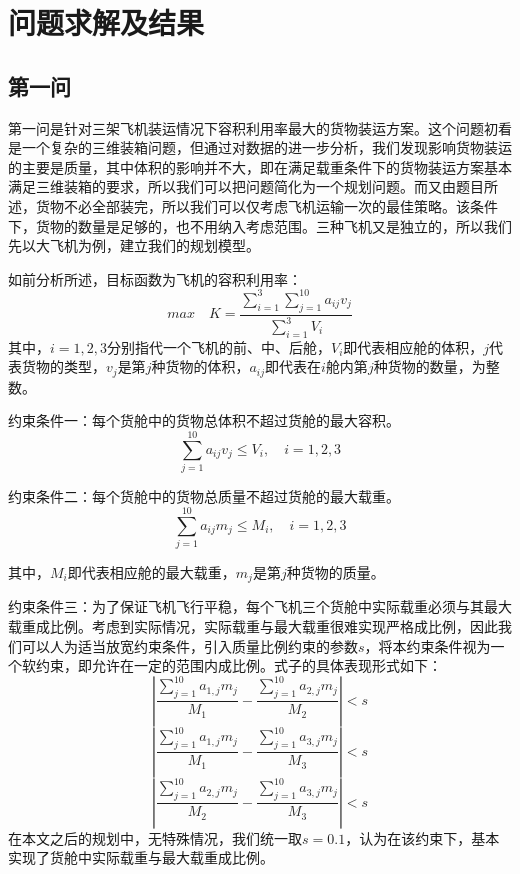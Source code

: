 \documentclass{article}
\begin{document}
	\section{问题求解及结果}
	\subsection{第一问}
	第一问是针对三架飞机装运情况下容积利用率最大的货物装运方案。这个问题初看是一个复杂的三维装箱问题，但通过对数据的进一步分析，我们发现影响货物装运的主要是质量，其中体积的影响并不大，即在满足载重条件下的货物装运方案基本满足三维装箱的要求，所以我们可以把问题简化为一个规划问题。而又由题目所述，货物不必全部装完，所以我们可以仅考虑飞机运输一次的最佳策略。该条件下，货物的数量是足够的，也不用纳入考虑范围。三种飞机又是独立的，所以我们先以大飞机为例，建立我们的规划模型。
	
	如前分析所述，目标函数为飞机的容积利用率：
	\begin{equation}
		max\quad  K=\frac{\sum_{i=1}^{3}\sum_{j=1}^{10}a_{ij}v_{j}}{\sum_{i=1}^{3}V_{i}}
	\end{equation}
	其中，$i=1,2,3$分别指代一个飞机的前、中、后舱，$V_{i}$即代表相应舱的体积，$j$代表货物的类型，$v_{j}$是第$j$种货物的体积，$a_{ij}$即代表在$i$舱内第$j$种货物的数量，为整数。
	
	约束条件一：每个货舱中的货物总体积不超过货舱的最大容积。
	\begin{equation}
		\sum_{j=1}^{10}a_{ij}v_{j}\leq V_{i},\quad i=1,2,3
	\end{equation}
	
	约束条件二：每个货舱中的货物总质量不超过货舱的最大载重。
	\begin{equation}
		\sum_{j=1}^{10}a_{ij}m_{j}\leq M_{i},\quad i=1,2,3
	\end{equation}
	
	其中，$M_{i}$即代表相应舱的最大载重，$m_{j}$是第$j$种货物的质量。
	
	约束条件三：为了保证飞机飞行平稳，每个飞机三个货舱中实际载重必须与其最大载重成比例。考虑到实际情况，实际载重与最大载重很难实现严格成比例，因此我们可以人为适当放宽约束条件，引入质量比例约束的参数$s$，将本约束条件视为一个软约束，即允许在一定的范围内成比例。式子的具体表现形式如下：
	\begin{equation}
		\left|\frac{\sum_{j=1}^{10}a_{1,j}m_{j}}{M_{1}}-\frac{\sum_{j=1}^{10}a_{2,j}m_{j}}{M_{2}}\right|<s
	\end{equation}
	\begin{equation}
		\left|\frac{\sum_{j=1}^{10}a_{1,j}m_{j}}{M_{1}}-\frac{\sum_{j=1}^{10}a_{3,j}m_{j}}{M_{3}}\right|<s
	\end{equation}
	\begin{equation}
		\left|\frac{\sum_{j=1}^{10}a_{2,j}m_{j}}{M_{2}}-\frac{\sum_{j=1}^{10}a_{3,j}m_{j}}{M_{3}}\right|<s
	\end{equation}
	在本文之后的规划中，无特殊情况，我们统一取$s=0.1$，认为在该约束下，基本实现了货舱中实际载重与最大载重成比例。
	
\end{document}
